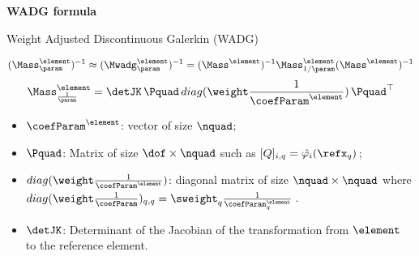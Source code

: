 \begin{frame}[noframenumbering]
\Large{\textbf{WADG formula}}
\end{frame}



\begin{frame}[noframenumbering]{Weight Adjusted Discontinuous Galerkin (WADG)}
  \scriptsize

  \begin{equation}
(\Mass^\element_\param)^{-1} \approx (\Mwadg^\element_\param)^{-1} = (\Mass^\element)^{-1} \Mass^\element_{1/\param} (\Mass^\element)^{-1}
\label{inv_wadg}
\end{equation}
\begin{equation}
\Mass^\element_{\frac{1}{\param}} = \detJK \, \Pquad\, diag(\weight \frac{1}{\coefParam^\element})\, \Pquad^\top \label{wadg_operator}
\end{equation}


\begin{itemize}
\item $\coefParam^\element$: vector of size $\nquad$;
\item $\Pquad$: Matrix of size $\dof \times \nquad$ such as $[Q]_{i,q} = \hat{\varphi_i}(\refx_q)$\,;
\item $diag(\weight \frac{1}{\coefParam^\element})$: diagonal matrix of size $\nquad \times \nquad$ where $diag(\weight \frac{1}{\coefParam})_{q,q} = \sweight_q \frac{1}{\coefParam^\element_q}$\,.
\item $\detJK$: Determinant of the Jacobian of the transformation from $\element$ to the reference element.
\end{itemize}

\end{frame}


